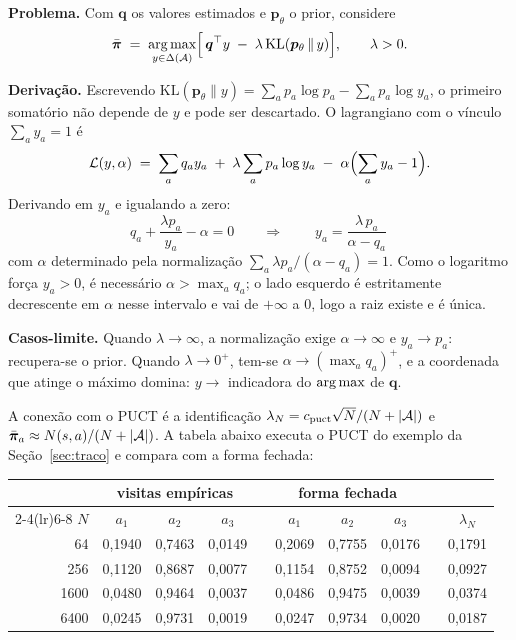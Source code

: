 \documentclass[11pt]{article}
\newcommand{\cpuct}{c_{\mathrm{puct}}}
\newcommand{\Nvis}{N}
\newcommand{\redepol}{\bm{p}_{\theta}}
\newcommand{\raizpol}{\bm{\pi}}
\begin{document}
\begin{provabox}
\textbf{Problema.} Com $\bm{q}$ os valores estimados e $\redepol$ o prior,
considere
\[
  \bar{\raizpol} \;=\; \argmax_{y \in \Delta(\gA)}
  \Bigl[\, \bm{q}^{\top} y \;-\; \lambda\,\mathrm{KL}(\redepol \,\|\, y) \Bigr],
  \qquad \lambda > 0 .
\]

\textbf{Derivação.} Escrevendo
$\mathrm{KL}(\redepol\|y) = \sum_a p_a \log p_a - \sum_a p_a \log y_a$, o primeiro
somatório não depende de $y$ e pode ser descartado. O lagrangiano com o vínculo
$\sum_a y_a = 1$ é
\[
  \mathcal{L}(y,\alpha) \;=\; \sum_a q_a y_a \;+\; \lambda \sum_a p_a \log y_a
  \;-\; \alpha\Bigl(\sum_a y_a - 1\Bigr).
\]
Derivando em $y_a$ e igualando a zero:
\[
  q_a + \frac{\lambda p_a}{y_a} - \alpha = 0
  \qquad\Longrightarrow\qquad
  \boxed{\ y_a = \frac{\lambda\, p_a}{\alpha - q_a}\ }
\]
com $\alpha$ determinado pela normalização
$\sum_a \lambda p_a/(\alpha - q_a) = 1$. Como o logaritmo força $y_a > 0$, é
necessário $\alpha > \max_a q_a$; o lado esquerdo é estritamente decrescente em
$\alpha$ nesse intervalo e vai de $+\infty$ a $0$, logo a raiz existe e é única.

\textbf{Casos-limite.} Quando $\lambda \to \infty$, a normalização exige
$\alpha \to \infty$ e $y_a \to p_a$: recupera-se o prior. Quando
$\lambda \to 0^{+}$, tem-se $\alpha \to (\max_a q_a)^{+}$, e a coordenada que
atinge o máximo domina: $y \to$ indicadora do $\operatorname*{arg\,max}$ de $\bm{q}$.
\end{provabox}

A conexão com o PUCT é a identificação
$\lambda_{\Nvis} = \cpuct\sqrt{\Nvis}/(\Nvis + \abs{\gA})$ e
$\bar{\raizpol}_a \approx \Nvis(s,a)/(\Nvis + \abs{\gA})$. A tabela abaixo executa
o PUCT do exemplo da Seção~\ref{sec:traco} e compara com a forma fechada:

\begin{center}
\small
\begin{tabular}{r ccc c ccc c c}
\toprule
& \multicolumn{3}{c}{visitas empíricas} && \multicolumn{3}{c}{forma fechada} && \\
\cmidrule(lr){2-4}\cmidrule(lr){6-8}
$\Nvis$ & $a_1$ & $a_2$ & $a_3$ && $a_1$ & $a_2$ & $a_3$ && $\lambda_{\Nvis}$ \\
\midrule
   64 & 0,1940 & 0,7463 & 0,0149 && 0,2069 & 0,7755 & 0,0176 && 0,1791 \\
  256 & 0,1120 & 0,8687 & 0,0077 && 0,1154 & 0,8752 & 0,0094 && 0,0927 \\
 1600 & 0,0480 & 0,9464 & 0,0037 && 0,0486 & 0,9475 & 0,0039 && 0,0374 \\
 6400 & 0,0245 & 0,9731 & 0,0019 && 0,0247 & 0,9734 & 0,0020 && 0,0187 \\
\bottomrule
\end{tabular}
\end{center}
\end{document}
